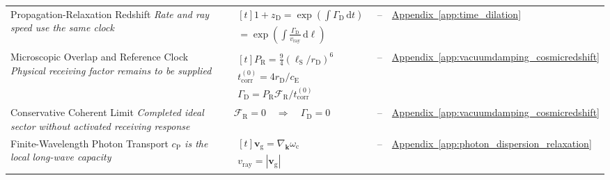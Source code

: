 \begin{longtable}{@{} p{4.5cm} p{6cm} c p{4cm} @{}}
{\raggedright Propagation-Relaxation Redshift \newline \textit{Rate and ray speed use the same clock}\par} & {\raggedright $\begin{gathered}[t]1+z_{\mathrm D}=\exp\!\left(\int\Gamma_{\mathrm D}\,\mathrm dt\right) \\ =\exp\!\left(\int\frac{\Gamma_{\mathrm D}}{v_{\mathrm{ray}}}\,\mathrm d\ell\right)\end{gathered}$\par} & -- & {\raggedright \hyperref[app:time_dilation]{Appendix~\ref*{app:time_dilation}}\par} \\

{\raggedright Microscopic Overlap and Reference Clock \newline \textit{Physical receiving factor remains to be supplied}\par} & {\raggedright $\begin{gathered}[t]P_{\mathrm R}=\frac94(\ell_{\mathrm S}/r_{\mathrm D})^6 \\ t_{\mathrm{corr}}^{(0)}=4r_{\mathrm D}/c_{\mathrm E} \\ \Gamma_{\mathrm D}=P_{\mathrm R}\mathcal F_{\mathrm R}/t_{\mathrm{corr}}^{(0)}\end{gathered}$\par} & -- & {\raggedright \hyperref[app:vacuumdamping_cosmicredshift]{Appendix~\ref*{app:vacuumdamping_cosmicredshift}}\par} \\

{\raggedright Conservative Coherent Limit \newline \textit{Completed ideal sector without activated receiving response}\par} & {\raggedright $\mathcal F_{\mathrm R}=0\quad\Longrightarrow\quad\Gamma_{\mathrm D}=0$\par} & -- & {\raggedright \hyperref[app:vacuumdamping_cosmicredshift]{Appendix~\ref*{app:vacuumdamping_cosmicredshift}}\par} \\

{\raggedright Finite-Wavelength Photon Transport \newline \textit{$c_{\mathrm P}$ is the local long-wave capacity}\par} & {\raggedright $\begin{gathered}[t]\mathbf v_{\mathrm g}=\nabla_{\mathbf k}\omega_{\mathrm c} \\ v_{\mathrm{ray}}=|\mathbf v_{\mathrm g}|\end{gathered}$\par} & -- & {\raggedright \hyperref[app:photon_dispersion_relaxation]{Appendix~\ref*{app:photon_dispersion_relaxation}}\par} \\


\end{longtable}
